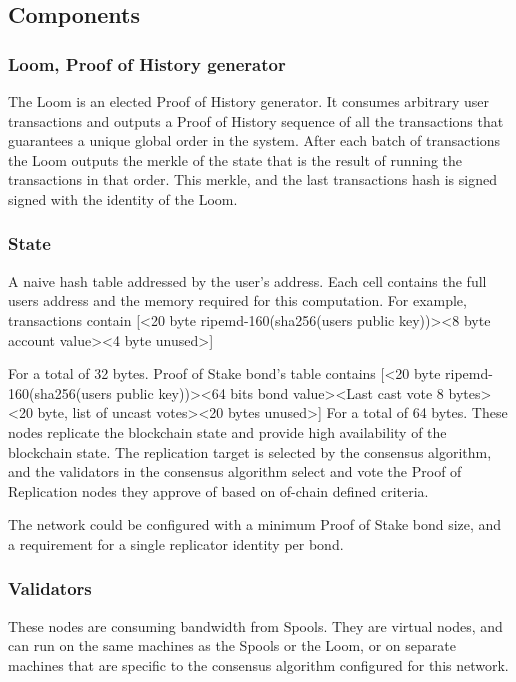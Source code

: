 \documentclass[12pt]{article}
\begin{document}
\subsection{Components}

\subsubsection{Loom, Proof of History generator}
The Loom is an elected Proof of History generator.  It consumes arbitrary user transactions and outputs a Proof of History sequence of all the transactions that guarantees a unique global order in the system.  After each batch of transactions the Loom outputs the merkle of the state that is the result of running the transactions in that order.  This merkle, and the last transactions hash is signed signed with the identity of the Loom.

\subsubsection{State}

A naive hash table addressed by the user’s address.  Each cell contains the full users address and the memory required for this computation.  For example, transactions contain
[<20 byte ripemd-160(sha256(users public key))><8 byte account value><4 byte unused>]

For a total of 32 bytes.   Proof of Stake bond’s table contains
[<20 byte ripemd-160(sha256(users public key))><64 bits bond value><Last cast vote 8 bytes><20 byte, list of uncast votes><20 bytes unused>]
For a total of 64 bytes.
These nodes replicate the blockchain state and provide high availability of the blockchain state. The replication target is selected by the consensus algorithm, and the validators in the consensus algorithm select and vote the Proof of Replication nodes they approve of based on of-chain defined criteria.

The network could be configured with a minimum Proof of Stake bond size, and a requirement for a single replicator identity per bond.
\subsubsection{Validators}
These nodes are consuming bandwidth from Spools.  They are virtual nodes, and can run on the same machines as the Spools or the Loom, or on separate machines that are specific to the consensus algorithm configured for this network.
\end{document}
